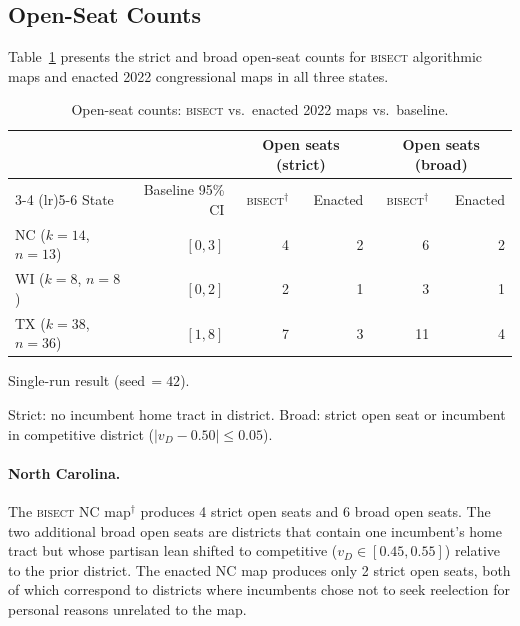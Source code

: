 \label{sec:results}

\subsection{Open-Seat Counts}

Table~\ref{tab:open-results} presents the strict and broad open-seat counts for
\textsc{bisect} algorithmic maps and enacted 2022 congressional maps in all three states.

\begin{table}[ht]
\centering
\begin{threeparttable}
\caption{Open-seat counts: \textsc{bisect} vs.\ enacted 2022 maps vs.\ baseline.}
\label{tab:open-results}
\begin{tabular}{l r r r r r}
\toprule
 & & \multicolumn{2}{c}{Open seats (strict)} & \multicolumn{2}{c}{Open seats (broad)} \\
\cmidrule(lr){3-4} \cmidrule(lr){5-6}
State & Baseline 95\% CI & \textsc{bisect}$^\dagger$ & Enacted & \textsc{bisect}$^\dagger$ & Enacted \\
\midrule
NC ($k=14$, $n=13$) & $[0, 3]$ & 4 & 2 & 6 & 2 \\
WI ($k=8$, $n=8$)   & $[0, 2]$ & 2 & 1 & 3 & 1 \\
TX ($k=38$, $n=36$) & $[1, 8]$ & 7 & 3 & 11 & 4 \\
\bottomrule
\end{tabular}
\begin{tablenotes}
\small
\item[$\dagger$] Single-run result (seed\,$=42$).
\item Strict: no incumbent home tract in district. Broad: strict open seat or incumbent
  in competitive district ($|v_D - 0.50| \leq 0.05$).
\end{tablenotes}
\end{threeparttable}
\end{table}

\paragraph{North Carolina.}
The \textsc{bisect} NC map$^\dagger$ produces 4 strict open seats and 6 broad open
seats. The two additional broad open seats are districts that contain one incumbent's
home tract but whose partisan lean shifted to competitive ($v_D \in [0.45, 0.55]$)
relative to the prior district. The enacted NC map produces only 2 strict open seats,
both of which correspond to districts where incumbents chose not to seek reelection
for personal reasons unrelated to the map.

